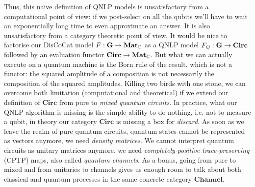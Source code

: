 Thus, this naive definition of QNLP models is unsatisfactory from a computational point of view: if we post-select on all the qubits we'll have to wait an exponentially long time to even approximate an answer.
It is also unsatisfactory from a category theoretic point of view.
It would be nice to factorise our DisCoCat model $F : \mathbf{G} \to \mathbf{Mat}_{\mathbb{C}}$ as a QNLP model $F_Q : \mathbf{G} \to \mathbf{Circ}$ followed by an evaluation functor $\mathbf{Circ} \to \mathbf{Mat}_{\mathbb{C}}$.
But what we can actually execute on a quantum machine is the Born rule of the result, which is not a functor: the squared amplitude of a composition is not necessarily the composition of the squared amplitudes.
Killing two birds with one stone, we can overcome both limitation (computational and theoretical) if we extend our definition of $\mathbf{Circ}$ from pure to \emph{mixed quantum circuits}.
In practice, what our QNLP algorithm is missing is the simple ability to do nothing, i.e. not to measure a qubit, in theory our category $\mathbf{Circ}$ is missing a box for \emph{discard}.
As soon as we leave the realm of pure quantum circuits, quantum states cannot be represented as vectors anymore, we need \emph{density matrices}.
We cannot interpret quantum circuits as unitary matrices anymore, we need \emph{completely-positive trace-preserving} (CPTP) maps, also called \emph{quantum channels}.
As a bonus, going from pure to mixed and from unitaries to channels gives us enough room to talk about both classical and quantum processes in the same concrete category $\mathbf{Channel}$.

